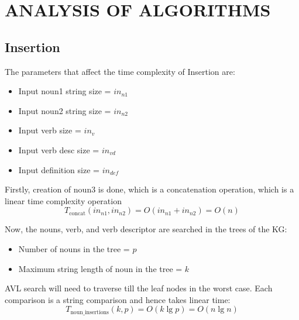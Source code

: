 \documentclass[conference]{IEEEtran}
\begin{document}





\section{ANALYSIS OF ALGORITHMS}
\subsection{Insertion}
The parameters that affect the time complexity of Insertion are:
\begin{itemize}
    \item Input noun1 string size = $in_{n1}$
    \item Input noun2 string size = $in_{n2}$
    \item Input verb size = $in_{v}$
    \item Input verb desc size = $in_{vd}$
    \item Input definition size = $in_{def}$
\end{itemize}

Firstly, creation of noun3 is done, which is a concatenation operation, which is a linear time complexity operation
\\
\begin{equation}
	T_{\text{concat}}(in_{n1}, in_{n2}) = O(in_{n1} + in_{n2}) = O(n)
\end{equation}

Now, the nouns, verb, and verb descriptor are searched in the trees of the KG:
\begin{itemize}
    \item Number of nouns in the tree = $p$
    \item Maximum string length of noun in the tree = $k$
\end{itemize}
AVL search will need to traverse till the leaf nodes in the worst case. Each comparison is a string comparison and hence takes linear time:
\begin{equation}
	T_{\text{noun\_insertions}}(k, p) = O(k \lg p) = O(n \lg n)
\end{equation}
\end{document}
